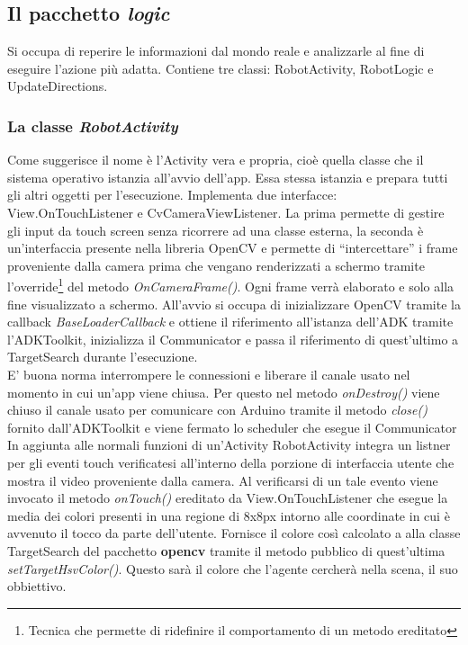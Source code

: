 \subsection {Il pacchetto \textit{logic}}
Si occupa di reperire le informazioni dal mondo reale e analizzarle al fine di
eseguire l'azione più adatta.
Contiene tre classi: RobotActivity, RobotLogic e UpdateDirections.
\subsubsection{La classe \emph{RobotActivity}}
Come suggerisce il nome è l'Activity vera e propria, cioè quella classe che il 
sistema operativo istanzia all'avvio dell'app. Essa stessa istanzia e prepara tutti gli 
altri oggetti per l'esecuzione. Implementa due interfacce: View.OnTouchListener 
e CvCameraViewListener. 
La prima permette di gestire gli input da touch screen senza ricorrere ad una classe esterna,
la seconda è un'interfaccia presente nella libreria OpenCV e permette di ``intercettare''
i frame proveniente dalla camera prima che vengano renderizzati a schermo tramite 
l'override\footnote{Tecnica che permette di ridefinire il comportamento di un metodo 
ereditato} del metodo \textit{OnCameraFrame()}. Ogni frame verrà elaborato e solo alla
fine visualizzato a schermo.
All'avvio si occupa di inizializzare OpenCV tramite la 
callback \textit{BaseLoaderCallback} e ottiene il riferimento all'istanza dell'ADK
tramite l'ADKToolkit, inizializza il Communicator e passa il riferimento di quest'ultimo
 a TargetSearch durante l'esecuzione.\\E' buona norma interrompere le connessioni e liberare il canale usato 
nel momento in cui un'app viene chiusa. Per questo nel metodo \emph{onDestroy()} 
viene chiuso il canale usato per comunicare con Arduino tramite il metodo \emph{close()}
fornito dall'ADKToolkit e viene fermato lo scheduler che esegue il Communicator\\
In aggiunta alle normali funzioni di un'Activity RobotActivity integra un 
listner per gli eventi touch verificatesi all'interno della porzione di 
interfaccia utente che mostra il video proveniente dalla camera. Al verificarsi di un
tale evento viene invocato il metodo \emph{onTouch()} ereditato da View.OnTouchListener 
che esegue la media dei colori presenti in una regione di 8x8px intorno alle coordinate
in cui è avvenuto il tocco da parte dell'utente. Fornisce il colore così calcolato a 
alla classe TargetSearch del pacchetto \textbf{opencv} tramite il metodo pubblico 
di quest'ultima \emph{setTargetHsvColor()}. Questo sarà il colore che l'agente cercherà
nella scena, il suo obbiettivo.

